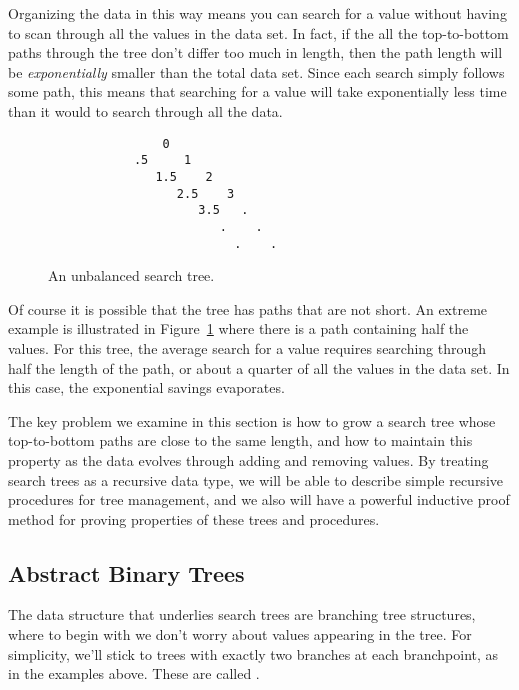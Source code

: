 Organizing the data in this way means you can search for a value
without having to scan through all the values in the data set.  In
fact, if the all the top-to-bottom paths through the tree don't differ
too much in length, then the path length will be \emph{exponentially}
smaller than the total data set.  Since each search simply follows
some path, this means that searching for a value will take
exponentially less time than it would to search through all the data.

\begin{figure}


\begin{verbatim}
                0
            .5     1
               1.5    2
                  2.5    3
                     3.5   .
                        .    .
                          .    .
\end{verbatim}   

\caption{An unbalanced search tree.}

\label{unbalanced}

\end{figure}


Of course it is possible that the tree has paths that are not short.
An extreme example is illustrated in Figure~\ref{unbalanced} where
there is a path containing half the values.  For this tree, the
average search for a value requires searching through half the length
of the path, or about a quarter of all the values in the data set.  In
this case, the exponential savings evaporates.

The key problem we examine in this section is how to grow a search
tree whose top-to-bottom paths are close to the same length, and how
to maintain this property as the data evolves through adding and
removing values.  By treating search trees as a recursive data type,
we will be able to describe simple recursive procedures for tree
management, and we also will have a powerful inductive proof method
for proving properties of these trees and procedures.

\subsection{Abstract Binary Trees}

The data structure that underlies search trees are branching tree
structures, where to begin with we don't worry about values appearing
in the tree.  For simplicity, we'll stick to trees with exactly two
branches at each branchpoint, as in the examples above.  These are
called .

